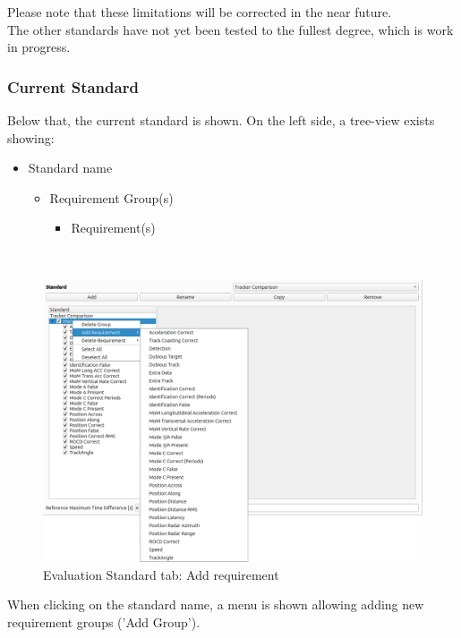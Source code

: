 Please note that these limitations will be corrected in the near future. \\ 

The other standards have not yet been tested to the fullest degree, which is work in progress.


\subsubsection{Current Standard}

Below that, the current standard is shown. On the left side, a tree-view exists showing:
\begin{itemize}  
\item Standard name
\begin{itemize}  
\item Requirement Group(s)
\begin{itemize}  
\item Requirement(s)
\end{itemize}
\end{itemize}
\end{itemize}
\ \\

\begin{figure}[H]
  \hspace*{-2cm}
    \includegraphics[width=18cm,frame]{figures/eval_standard_add_req.png}
  \caption{Evaluation Standard tab: Add requirement}
\end{figure}

When clicking on the standard name, a menu is shown allowing adding new requirement groups ('Add Group'). \\

